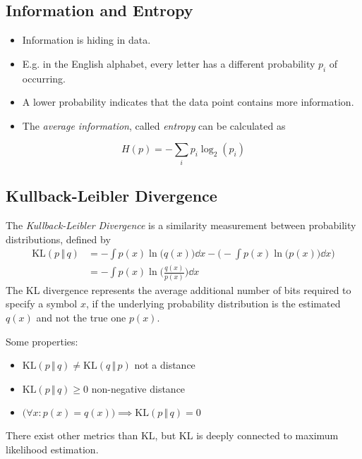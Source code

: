 		\subsection{Information and Entropy}
			\begin{itemize}
				\item Information is hiding in data.
				\item E.g. in the English alphabet, every letter has a different probability \(p_i\) of occurring.
				\item A lower probability indicates that the data point contains more information.
				\item The \emph{average information}, called \emph{entropy} can be calculated as
			\end{itemize}
			\begin{equation}
				H(p) = -\sum_{i} p_i \log_2(p_i)
			\end{equation}

		\subsection{Kullback-Leibler Divergence}
			The \emph{Kullback-Leibler Divergence} is a similarity measurement between probability distributions, defined by
			\begin{align}
				\textrm{KL}(p \,\Vert\, q) & = -\int p(x) \ln\big(q(x)\big) \dd{x} - \Bigg( -\int p(x) \ln\big(p(x)\big) \dd{x} \Bigg) \\
				                           & = -\int p(x) \ln\bigg(\frac{q(x)}{p(x)}\bigg) \dd{x}
			\end{align}
			The KL divergence represents the average additional number of bits required to specify a symbol \(x\), if the underlying probability distribution is the estimated \(q(x)\) and not the true one \(p(x)\).

			Some properties:
			\begin{itemize}
				\item \( \textrm{KL}(p \,\Vert\, q) \neq \textrm{KL}(q \,\Vert\, p) \) not a distance
				\item \( \textrm{KL}(p \,\Vert\, q) \geq 0 \) non-negative distance
				\item \( \big(\forall x : p(x) = q(x)\big) \implies \textrm{KL}(p \,\Vert\, q) = 0 \)
			\end{itemize}

			There exist other metrics than KL, but KL is deeply connected to maximum likelihood estimation. 

